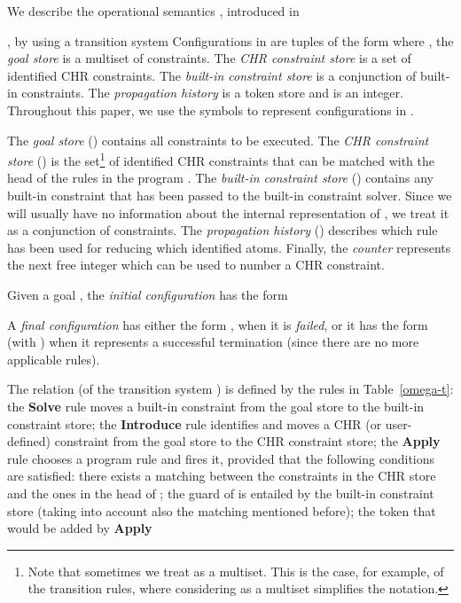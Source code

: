 \documentclass{tlp}
\begin{document}
We describe the operational semantics , introduced in {\cite{DSGH04}, by using a transition system
 Configurations in  are
tuples of the form  where , the {\em goal store} is a multiset of constraints. The \emph{CHR constraint store}  is a set of
identified CHR constraints. The \emph{built-in constraint store}  is a
conjunction of built-in constraints. The {\em propagation history}
 is a token store and  is an integer.
Throughout this paper, we use the symbols  to represent configurations in .

The \emph{goal store} () contains all constraints to
be executed. The \emph{CHR constraint store} () is the set\footnote{Note that sometimes we treat  as a multiset. This is the case, for example, of the transition rules, where considering  as a multiset simplifies the notation.} of
identified CHR constraints that can be matched with the head of the
rules in the program . The \emph{built-in constraint store} () contains any built-in  constraint that has been passed to the built-in constraint solver. Since we will usually have no information about the
internal representation of , we treat it as a conjunction of constraints. The {\em propagation history}
() describes which rule has been used
for reducing which identified atoms. Finally, the \emph{counter}  represents the next
free integer which can be used to number a CHR constraint.




Given a goal , the  {\em initial configuration} has the form

A {\em final configuration} has either the form , when it is {\em failed}, or it
has the form  (with ) when it
represents a successful termination (since there are no more
applicable rules).


The relation  (of the transition system
) is defined  by the rules
in Table~\ref{omega-t}: the \textbf{Solve} rule moves a
built-in constraint from the goal store to the built-in constraint
store; the \textbf{Introduce} rule identifies and moves a CHR (or user-defined) constraint from the goal store to the CHR constraint
store;  the \textbf{Apply} rule chooses a program rule  and fires it, provided that the following conditions are satisfied: there exists a matching between the constraints in the CHR store and the ones in
the head of ; the guard of  is
entailed by the built-in constraint store (taking into account also the
matching mentioned before); the token that would be added by \textbf{Apply}}
\end{document}

